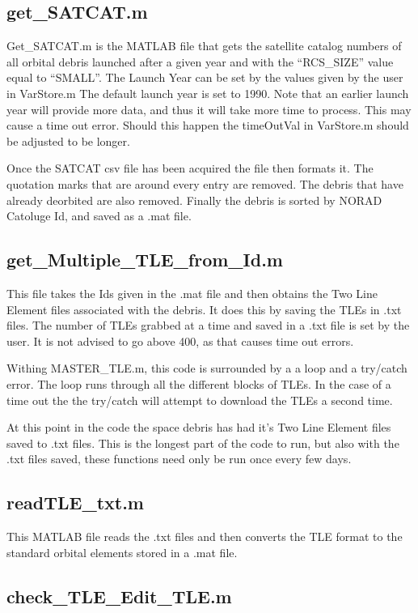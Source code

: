 \documentclass[12pt]{report}
\begin{document}
		\subsection{get\_SATCAT.m}
		Get\_SATCAT.m is the MATLAB file that gets the satellite catalog  numbers of all orbital debris launched after a given year and with the “RCS\_SIZE” value equal to “SMALL”. The Launch Year can be set by the values given by the user in VarStore.m The default launch year is set to 1990. Note that an earlier launch year will provide more data, and thus it will take more time to process. This may cause a time out error. Should this happen the timeOutVal in VarStore.m should be adjusted to be longer.\par 
		Once the SATCAT csv file has been acquired the file then formats it. The quotation marks that are around every entry are removed. The debris that have already deorbited are also removed. Finally the debris is sorted by NORAD Catoluge Id, and saved as a .mat file.
		\subsection{get\_Multiple\_TLE\_from\_Id.m}
		This file takes the Ids given in the .mat file and then obtains the Two Line Element files associated with the debris. It does this by saving the TLEs in .txt files. The number of TLEs grabbed at a time and saved in a .txt file is set by the user. It is not advised to go above 400, as that causes time out errors. \par 
		Withing MASTER\_TLE.m, this code is surrounded by a a loop and a try/catch error. The loop runs through all the different blocks of TLEs. In the case of a time out the the try/catch will attempt to download the TLEs a second time.\par 
		At this point in the code the space debris has had it's Two Line Element files saved to .txt files. This is the longest part of the code to run, but also with the .txt files saved, these functions need only be run once every few days. 

		\subsection{readTLE\_txt.m}
		This MATLAB file reads the .txt files and then converts the TLE format to the standard orbital elements stored in a .mat file. 
		\subsection{check\_TLE\_Edit\_TLE.m}
		
\end{document}
